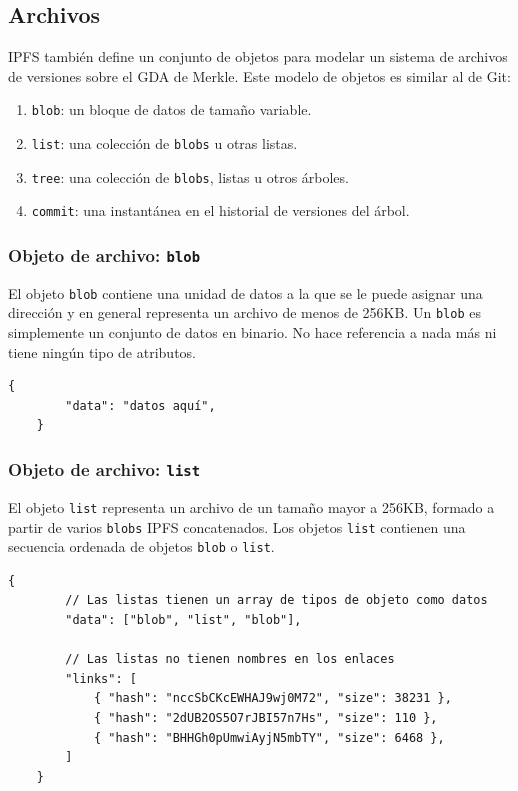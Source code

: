 \documentclass[12pt]{article} %
\begin{document}
\subsection{Archivos} %
\label{sub:archivos}

IPFS también define un conjunto de objetos para modelar un sistema de archivos de versiones sobre el GDA de Merkle. Este modelo de objetos es similar al de Git:
\begin{enumerate}
	\item \texttt{blob}: un bloque de datos de tamaño variable.
	\item \texttt{list}: una colección de \texttt{blobs} u otras listas.
	\item \texttt{tree}: una colección de \texttt{blobs}, listas u otros árboles.
	\item \texttt{commit}: una instantánea en el historial de versiones del árbol.
\end{enumerate}

\subsubsection{Objeto de archivo: \texttt{blob}} %
\label{ssub:objeto_de_archivo_blob}

El objeto \texttt{blob} contiene una unidad de datos a la que se le puede asignar una dirección y en general representa un archivo de menos de 256KB. Un \texttt{blob} es simplemente un conjunto de datos en binario. No hace referencia a nada más ni tiene ningún tipo de atributos.

\begin{lstlisting}[caption={Estructura JSON de un \texttt{blob}.}]
	{
		"data": "datos aquí",
	}
\end{lstlisting}


\subsubsection{Objeto de archivo: \texttt{list}} %
\label{ssub:objeto_de_archivo_list}

El objeto \texttt{list} representa un archivo de un tamaño mayor a 256KB, formado a partir de varios \texttt{blobs} IPFS concatenados. Los objetos \texttt{list} contienen una secuencia ordenada de objetos \texttt{blob} o \texttt{list}.

\begin{lstlisting}[caption={Estructura JSON de un \texttt{list}.}]
	{
		// Las listas tienen un array de tipos de objeto como datos
		"data": ["blob", "list", "blob"],

		// Las listas no tienen nombres en los enlaces
		"links": [
			{ "hash": "nccSbCKcEWHAJ9wj0M72", "size": 38231 },
			{ "hash": "2dUB2OS5O7rJBI57n7Hs", "size": 110 },
			{ "hash": "BHHGh0pUmwiAyjN5mbTY", "size": 6468 },
		]
	}
\end{lstlisting}
\end{document}
